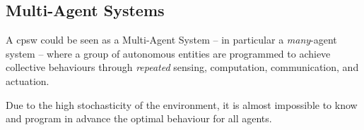 \subsection{Multi-Agent Systems}
A \ac{cpsw} could be seen as a Multi-Agent System -- in particular a \emph{many}-agent system -- where a group of autonomous entities are programmed to achieve collective behaviours through \emph{repeated} sensing, computation, communication, and actuation.

Due to the high stochasticity of the environment, it is almost impossible to know and program in advance the optimal behaviour for all agents.
%
